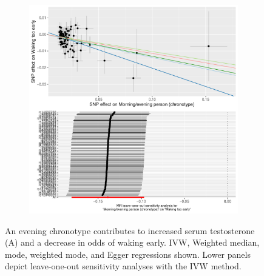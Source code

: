\documentclass{article}
\begin{document}
\begin{figure}[htbp]
\begin{subfigure}[b]{0.4\textwidth}
         \includegraphics[width=\textwidth]{Figs/Analysis2/Morning_evening_person_(chronotype)_vs_Waking_too_early.Plots.pdf}
         \caption{}
         \label{waking}
     \end{subfigure}
        \caption{An evening chronotype contributes to increased serum testosterone (A) and a decrease in odds of waking early. IVW, Weighted median, mode, weighted mode, and Egger regressions shown. Lower panels depict leave-one-out sensitivity analyses with the IVW method.}
        \label{t2dmalcohol}
\end{figure}
\end{document}
